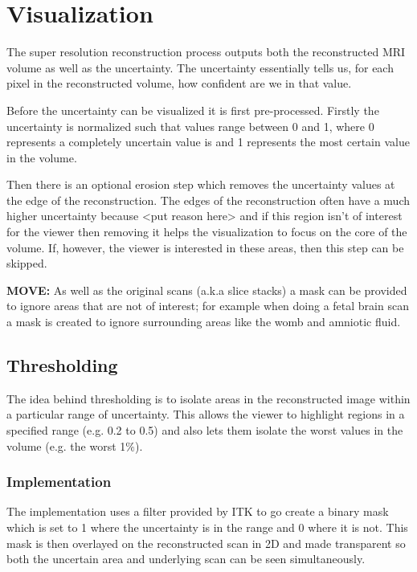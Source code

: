 \chapter{Visualization}

The super resolution reconstruction process outputs both the reconstructed MRI volume as well as the uncertainty. The uncertainty essentially tells us, for each pixel in the reconstructed volume, how confident are we in that value.

Before the uncertainty can be visualized it is first pre-processed. Firstly the uncertainty is normalized such that values range between 0 and 1, where 0 represents a completely uncertain value is and 1 represents the most certain value in the volume. 

Then there is an optional erosion step which removes the uncertainty values at the edge of the reconstruction. The edges of the reconstruction often have a much higher uncertainty because <put reason here> and if this region isn't of interest for the viewer then removing it helps the visualization to focus on the core of the volume. If, however, the viewer is interested in these areas, then this step can be skipped.

\textbf{MOVE:} As well as the original scans (a.k.a slice stacks) a mask can be provided to ignore areas that are not of interest; for example when doing a fetal brain scan a mask is created to ignore surrounding areas like the womb and amniotic fluid.

\section{Thresholding}\label{section:thresholding}

The idea behind thresholding is to isolate areas in the reconstructed image within a particular range of uncertainty. This allows the viewer to highlight regions in a specified range (e.g. 0.2 to 0.5) and also lets them isolate the worst values in the volume (e.g. the worst 1$\%$).

\subsection*{Implementation}
The implementation uses a filter provided by ITK to go create a binary mask which is set to 1 where the uncertainty is in the range and 0 where it is not. This mask is then overlayed on the reconstructed scan in 2D and made transparent so both the uncertain area and underlying scan can be seen simultaneously.

